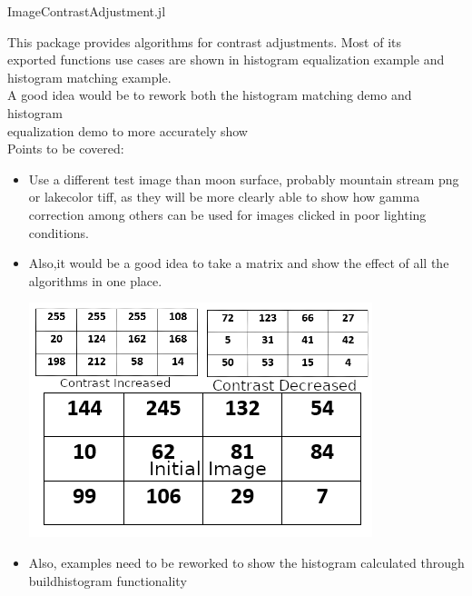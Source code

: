 \vspace{0.5cm}
\Large
\textsf{ImageContrastAdjustment.jl}

\vspace{0.5cm}
\large
This package provides algorithms for contrast adjustments.
Most of its \\ exported functions use cases are shown in histogram equalization example and \\histogram matching example.\\

A good idea would be to rework both the histogram matching demo and histogram \\equalization demo to more accurately show
\\
Points to be covered:

\begin{itemize}
    \item Use a different test image than moon surface, probably  mountain stream png or lakecolor tiff, as they will be more clearly able to show how gamma correction among others can be used for
    images clicked in poor lighting conditions.
    
    \item Also,it would be a good idea to take a matrix and show the effect of all the algorithms in one place.
    \begin{displayquote}
       \includegraphics[scale=0.5]{assets/contrast.png}
    \end{displayquote}
    \item Also, examples need to be reworked to show the histogram calculated through buildhistogram functionality
\end{itemize} 


